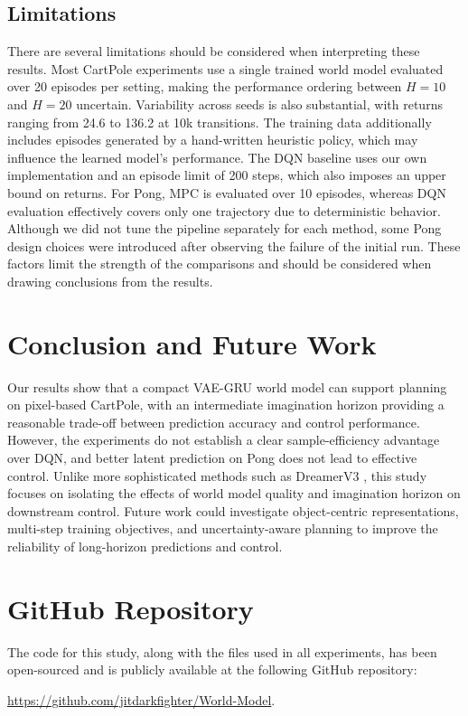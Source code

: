 \documentclass[conference]{IEEEtran}
\begin{document}
\subsection{Limitations}
There are several limitations should be considered when interpreting these results. Most CartPole experiments use a single trained world model evaluated over 20 episodes per setting, making the performance ordering between $H{=}10$ and $H{=}20$ uncertain. Variability across seeds is also substantial, with returns ranging from 24.6 to 136.2 at 10k transitions. The training data additionally includes episodes generated by a hand-written heuristic policy, which may influence the learned model's performance. The DQN baseline uses our own implementation and an episode limit of 200 steps, which also imposes an upper bound on returns. For Pong, MPC is evaluated over 10 episodes, whereas DQN evaluation effectively covers only one trajectory due to deterministic behavior. Although we did not tune the pipeline separately for each method, some Pong design choices were introduced after observing the failure of the initial run. These factors limit the strength of the comparisons and should be considered when drawing conclusions from the results.

\section{Conclusion and Future Work}
Our results show that a compact VAE-GRU world model can support planning on pixel-based CartPole, with an intermediate imagination horizon providing a reasonable trade-off between prediction accuracy and control performance. However, the experiments do not establish a clear sample-efficiency advantage over DQN, and better latent prediction on Pong does not lead to effective control. Unlike more sophisticated methods such as DreamerV3 \cite{hafner2023}, this study focuses on isolating the effects of world model quality and imagination horizon on downstream control. Future work could investigate object-centric representations, multi-step training objectives, and uncertainty-aware planning to improve the reliability of long-horizon predictions and control.




\section{GitHub Repository}

The code for this study, along with the files used in all experiments, has been open-sourced and is publicly available at the following GitHub repository:

\href{https://github.com/jitdarkfighter/World-Model}{https://github.com/jitdarkfighter/World-Model}.
\end{document}

